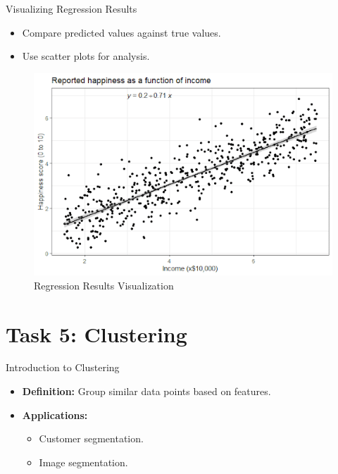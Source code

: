 \documentclass{beamer}
\begin{document}
\begin{frame}{Visualizing Regression Results}
\begin{itemize}
    \item Compare predicted values against true values.
    \item Use scatter plots for analysis.
\end{itemize}
\begin{figure}
    \centering
    \includegraphics[width=0.8\linewidth]{regression_results.png}
    \caption{Regression Results Visualization}
\end{figure}
\end{frame}

\section{Task 5: Clustering}

\begin{frame}{Introduction to Clustering}
\begin{itemize}
    \item \textbf{Definition:} Group similar data points based on features.
    \item \textbf{Applications:}
    \begin{itemize}
        \item Customer segmentation.
        \item Image segmentation.
    \end{itemize}
\end{itemize}
\end{frame}
\end{document}
